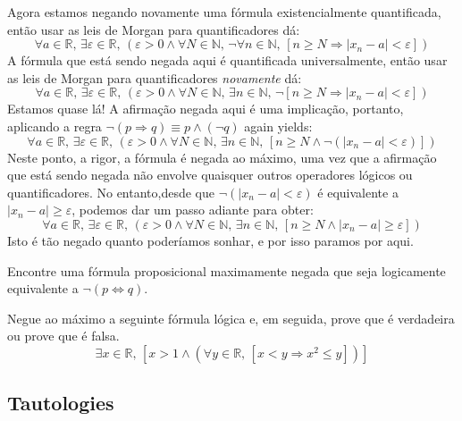 \begin{example}
%
Agora estamos negando novamente uma fórmula existencialmente quantificada, então usar as leis de Morgan para quantificadores dá:
\[ \forall a \in \mathbb{R},\, \exists \varepsilon \in \mathbb{R},\, (\varepsilon > 0 \wedge \forall N \in \mathbb{N},\, \neg \forall n \in \mathbb{N},\, [n \ge N \Rightarrow |x_n-a| < \varepsilon])\]
%
A fórmula que está sendo negada aqui é quantificada universalmente, então usar as leis de Morgan para quantificadores \textit{novamente} dá:
\[ \forall a \in \mathbb{R},\, \exists \varepsilon \in \mathbb{R},\, (\varepsilon > 0 \wedge \forall N \in \mathbb{N},\, \exists n \in \mathbb{N},\, \neg [n \ge N \Rightarrow |x_n-a| < \varepsilon])\]
%
Estamos quase lá! A afirmação negada aqui é uma implicação, portanto, aplicando a regra $\neg (p \Rightarrow q) \equiv p \wedge (\neg q)$ again yields:
\[ \forall a \in \mathbb{R},\, \exists \varepsilon \in \mathbb{R},\, (\varepsilon > 0 \wedge \forall N \in \mathbb{N},\, \exists n \in \mathbb{N},\, [n \ge N \wedge \neg (|x_n - a| < \varepsilon)])\]
%
Neste ponto, a rigor, a fórmula é negada ao máximo, uma vez que a afirmação que está sendo negada não envolve quaisquer outros operadores lógicos ou quantificadores. No entanto,desde que $\neg (|x_n-a| < \varepsilon)$ é equivalente a $|x_n - a| \ge \varepsilon$, podemos dar um passo adiante para obter:
\[ \forall a \in \mathbb{R},\, \exists \varepsilon \in \mathbb{R},\, (\varepsilon > 0 \wedge \forall N \in \mathbb{N},\, \exists n \in \mathbb{N},\, [n \ge N \wedge |x_n - a| \ge \varepsilon])\]
%
Isto é tão negado quanto poderíamos sonhar, e por isso paramos por aqui.
\end{example}

\begin{exercise}
Encontre uma fórmula proposicional maximamente negada que seja logicamente equivalente a $\neg (p \Leftrightarrow q)$.
\end{exercise}

\begin{exercise}
Negue ao máximo a seguinte fórmula lógica e, em seguida, prove que é verdadeira ou prove que é falsa.
\[ \exists x \in \mathbb{R},\, [x > 1 \wedge (\forall y \in \mathbb{R},\, [x < y \Rightarrow x^2 \le y])]\]
\end{exercise}

\subsection*{Tautologies}

